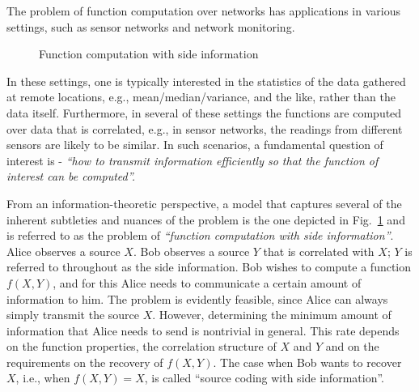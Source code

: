 \documentclass[journal, onecolumn, draftcls]{IEEEtran}
\theoremstyle{definition}
\begin{document}
The problem of function computation over networks has applications in various settings, such as sensor networks \cite{akyildiz2002survey} and network monitoring. 
\begin{figure}[!b] 
\begin{center} 
\end{center}
 \caption{Function computation with side information
 \label{fig:func_computing_diag}} 
\end{figure}
In these settings, one is typically interested in the statistics of the data gathered at remote locations, e.g., mean/median/variance, and the like, rather than the data itself. Furthermore, in several of these settings the functions are computed over data that is correlated, e.g., in sensor networks, the readings from different sensors are likely to be similar. In such scenarios, a fundamental question of interest is - {\it ``how to transmit information efficiently so that the function of interest can be computed''.} 


From an information-theoretic perspective, a model that captures several of the inherent subtleties and nuances of the problem is the one depicted in Fig.~\ref{fig:func_computing_diag} and is referred to as the problem of {\it ``function computation with side information''}. Alice observes a source $X$. Bob observes a source $Y$ that is correlated with $X$; $Y$ is referred to throughout as the side information. Bob wishes to compute a function $f(X,Y)$, and for this Alice needs to communicate a certain amount of information to him. The problem is evidently feasible, since Alice can always simply transmit the source $X$. However, determining the minimum amount of information that Alice needs to send is nontrivial in general. This rate depends on the function properties, the correlation structure of $X$ and $Y$ and on the requirements on the recovery of $f(X,Y)$. The case when Bob wants to recover $X$, i.e., when $f(X,Y) = X$, is called ``source coding with side information''.  
\end{document}
